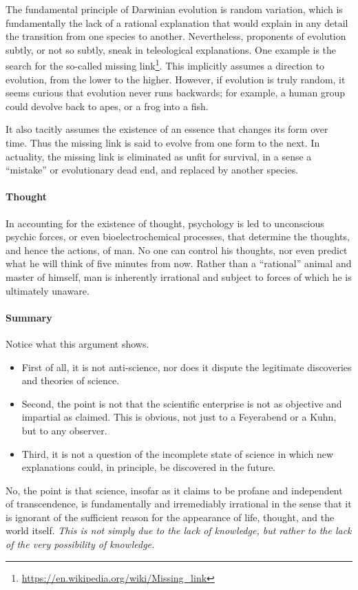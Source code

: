 The fundamental principle of Darwinian evolution is random variation, which is fundamentally the lack of a rational explanation that would explain in any detail the transition from one species to another. Nevertheless, proponents of evolution subtly, or not so subtly, sneak in teleological explanations. One example is the search for the so-called missing link\footnote{\url{https://en.wikipedia.org/wiki/Missing\_link}}. This implicitly assumes a direction to evolution, from the lower to the higher. However, if evolution is truly random, it seems curious that evolution never runs backwards; for example, a human group could devolve back to apes, or a frog into a fish.

It also tacitly assumes the existence of an essence that changes its form over time. Thus the missing link is said to evolve from one form to the next. In actuality, the missing link is eliminated as unfit for survival, in a sense a ``mistake'' or evolutionary dead end, and replaced by another species.

\paragraph{Thought}


In accounting for the existence of thought, psychology is led to unconscious psychic forces, or even bioelectrochemical processes, that determine the thoughts, and hence the actions, of man. No one can control his thoughts, nor even predict what he will think of five minutes from now. Rather than a ``rational'' animal and master of himself, man is inherently irrational and subject to forces of which he is ultimately unaware.

\paragraph{Summary}


Notice what this argument shows.

\begin{itemize}


\item First of all, it is not anti-science, nor does it dispute the legitimate discoveries and theories of science.

\item Second, the point is not that the scientific enterprise is not as objective and impartial as claimed. This is obvious, not just to a Feyerabend or a Kuhn, but to any observer.

\item Third, it is not a question of the incomplete state of science in which new explanations could, in principle, be discovered in the future.
\end{itemize}


No, the point is that science, insofar as it claims to be profane and independent of transcendence, is fundamentally and irremediably irrational in the sense that it is ignorant of the sufficient reason for the appearance of life, thought, and the world itself. \emph{This is not simply due to the lack of knowledge, but rather to the lack of the very possibility of knowledge.}




